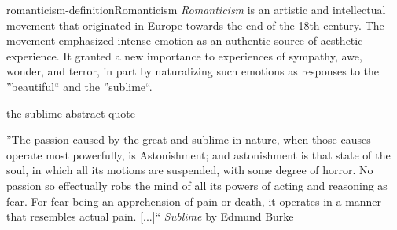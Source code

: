 \documentclass[preview]{standalone}
\begin{document}
\genpage

\begin{snippetdefinition}{romanticism-definition}{Romanticism}
    \textit{Romanticism} is an artistic and intellectual movement that originated
    in Europe towards the end of the 18th century.
    The movement emphasized intense emotion as an authentic source of aesthetic experience.
    It granted a new importance to experiences of sympathy, awe, wonder, and terror,
    in part by naturalizing such emotions as responses to the ''beautiful`` and the ''sublime``.
\end{snippetdefinition}


\begin{snippet}{the-sublime-abstract-quote}
    \begin{displayquote}
    ''The passion caused by the great and sublime in nature, when those causes operate most powerfully, is Astonishment; and astonishment is that state of the soul, in which all its motions are suspended, with some degree of horror. No passion so effectually robs the mind of all its powers of acting and reasoning as fear. For fear being an apprehension of pain or death, it operates in a manner that resembles actual pain. [...]``
    \textit{Sublime} by Edmund Burke
    \end{displayquote}
\end{snippet}
\end{document}
